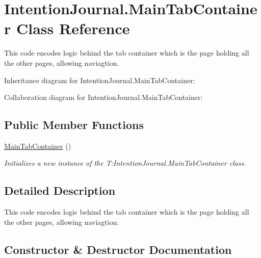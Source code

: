 \hypertarget{class_intention_journal_1_1_main_tab_container}{}\section{Intention\+Journal.\+Main\+Tab\+Container Class Reference}
\label{class_intention_journal_1_1_main_tab_container}


This code encodes logic behind the tab container which is the page holding all the other pages, allowing naviagtion.  




Inheritance diagram for Intention\+Journal.\+Main\+Tab\+Container\+:


Collaboration diagram for Intention\+Journal.\+Main\+Tab\+Container\+:
\subsection*{Public Member Functions}
\begin{DoxyCompactItemize}
\item 
\hyperlink{class_intention_journal_1_1_main_tab_container_a4c98beb8be162b49cdae752c683cf60e}{Main\+Tab\+Container} ()
\begin{DoxyCompactList}\small\item\em Initializes a new instance of the T\+:\+Intention\+Journal.\+Main\+Tab\+Container class. \end{DoxyCompactList}\end{DoxyCompactItemize}


\subsection{Detailed Description}
This code encodes logic behind the tab container which is the page holding all the other pages, allowing naviagtion. 



\subsection{Constructor \& Destructor Documentation}
\mbox{\label{class_intention_journal_1_1_main_tab_container_a4c98beb8be162b49cdae752c683cf60e}} 
